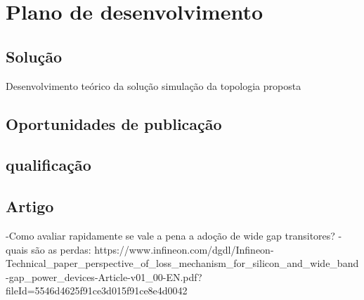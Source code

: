 \chapter{Plano de desenvolvimento}

\section{Solução}
Desenvolvimento teórico da solução
simulação da topologia proposta
\section{Oportunidades de publicação}




\section{qualificação}


\section{Artigo}
-Como avaliar rapidamente se vale a pena a adoção de wide gap transitores? 
-quais são as perdas: https://www.infineon.com/dgdl/Infineon-Technical_paper_perspective_of_loss_mechanism_for_silicon_and_wide_band-gap_power_devices-Article-v01_00-EN.pdf?fileId=5546d4625f91ce3d015f91ce8e4d0042
